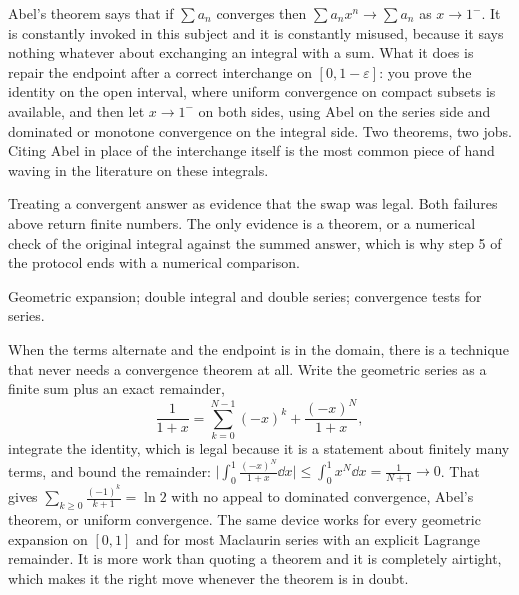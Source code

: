 \begin{keynote}
Abel's theorem says that if $\sum a_n$ converges then $\sum a_nx^{n}\to\sum a_n$ as $x\to1^{-}$. It is constantly invoked in this subject and it is constantly misused, because it says nothing whatever about exchanging an integral with a sum. What it does is repair the endpoint after a correct interchange on $[0,1-\varepsilon]$: you prove the identity on the open interval, where uniform convergence on compact subsets is available, and then let $x\to1^{-}$ on both sides, using Abel on the series side and dominated or monotone convergence on the integral side. Two theorems, two jobs. Citing Abel in place of the interchange itself is the most common piece of hand waving in the literature on these integrals.
\end{keynote}

\begin{trap}
Treating a convergent answer as evidence that the swap was legal. Both failures above return finite numbers. The only evidence is a theorem, or a numerical check of the original integral against the summed answer, which is why step 5 of the protocol ends with a numerical comparison.
\end{trap}

\begin{seealsob}Geometric expansion; double integral and double series; convergence tests for series.\end{seealsob}

\begin{keynote}
When the terms alternate and the endpoint is in the domain, there is a technique that never needs a convergence theorem at all. Write the geometric series as a finite sum plus an exact remainder,
\[\frac{1}{1+x}=\sum_{k=0}^{N-1}(-x)^{k}+\frac{(-x)^{N}}{1+x},\]
integrate the identity, which is legal because it is a statement about finitely many terms, and bound the remainder: $\bigl\lvert\int_0^1\frac{(-x)^{N}}{1+x}\dd x\bigr\rvert\leq\int_0^1x^{N}\dd x=\frac{1}{N+1}\to0$. That gives $\sum_{k\geq0}\frac{(-1)^{k}}{k+1}=\ln2$ with no appeal to dominated convergence, Abel's theorem, or uniform convergence. The same device works for every geometric expansion on $[0,1]$ and for most Maclaurin series with an explicit Lagrange remainder. It is more work than quoting a theorem and it is completely airtight, which makes it the right move whenever the theorem is in doubt.
\end{keynote}

